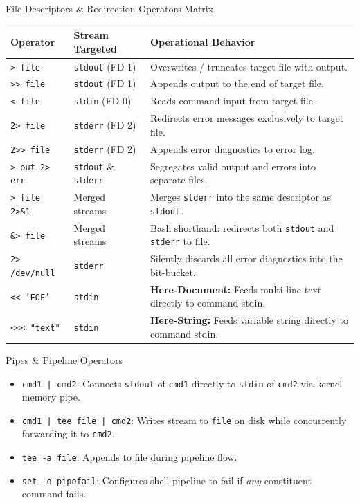 \begin{syntaxbox}{File Descriptors \& Redirection Operators Matrix}
\begin{tabularx}{\linewidth}{l l X}
\toprule
\textbf{Operator} & \textbf{Stream Targeted} & \textbf{Operational Behavior} \\
\midrule
\texttt{> file} & \texttt{stdout} (FD 1) & Overwrites / truncates target file with output. \\
\texttt{>> file} & \texttt{stdout} (FD 1) & Appends output to the end of target file. \\
\texttt{< file} & \texttt{stdin} (FD 0) & Reads command input from target file. \\
\texttt{2> file} & \texttt{stderr} (FD 2) & Redirects error messages exclusively to target file. \\
\texttt{2>> file} & \texttt{stderr} (FD 2) & Appends error diagnostics to error log. \\
\texttt{> out 2> err} & \texttt{stdout} \& \texttt{stderr} & Segregates valid output and errors into separate files. \\
\texttt{> file 2>\&1} & Merged streams & Merges \texttt{stderr} into the same descriptor as \texttt{stdout}. \\
\texttt{\&> file} & Merged streams & Bash shorthand: redirects both \texttt{stdout} and \texttt{stderr} to file. \\
\texttt{2> /dev/null} & \texttt{stderr} & Silently discards all error diagnostics into the bit-bucket. \\
\texttt{<< 'EOF'} & \texttt{stdin} & \textbf{Here-Document:} Feeds multi-line text directly to command stdin. \\
\texttt{<<< "text"} & \texttt{stdin} & \textbf{Here-String:} Feeds variable string directly to command stdin. \\
\bottomrule
\end{tabularx}
\end{syntaxbox}

\begin{cheatbox}{Pipes \& Pipeline Operators}
\begin{itemize}[leftmargin=1.5em]
    \item \texttt{cmd1 | cmd2}: Connects \texttt{stdout} of \texttt{cmd1} directly to \texttt{stdin} of \texttt{cmd2} via kernel memory pipe.
    \item \texttt{cmd1 | tee file | cmd2}: Writes stream to \texttt{file} on disk while concurrently forwarding it to \texttt{cmd2}.
    \item \texttt{tee -a file}: Appends to file during pipeline flow.
    \item \texttt{set -o pipefail}: Configures shell pipeline to fail if \textit{any} constituent command fails.
\end{itemize}
\end{cheatbox}
